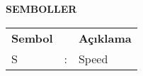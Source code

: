 \newpage
\pagestyle{plain}
\begin{center}
\textbf{SEMBOLLER}
\end{center}
\vspace{\satbos}

\begin{tabular}{@{}lll@{}}
\textbf{Sembol} &  & \textbf{Açıklama}\\
S & : & Speed\\
\end{tabular}
